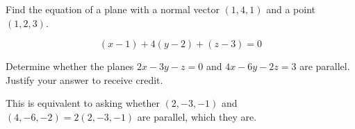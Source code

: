 \documentclass[addpoints]{exam}
\begin{document}
\printanswers
\begin{questions}
\question[30]  Find the equation of a plane with a normal vector $(1,4,1)$ and a point $(1,2,3)$. 
\begin{solution}
\[
(x - 1) + 4(y - 2) + (z - 3) = 0
\]
\end{solution}
\question[30] Determine whether the planes $2x - 3y - z = 0$ and $4x - 6y - 2z = 3$ are parallel. Justify your answer to receive credit. 
\begin{solution}
This is equivalent to asking whether $(2,-3,-1)$ and $(4,-6,-2) = 2(2,-3,-1)$ are parallel, which they are. 
\end{solution}


\end{questions}
\end{document}
